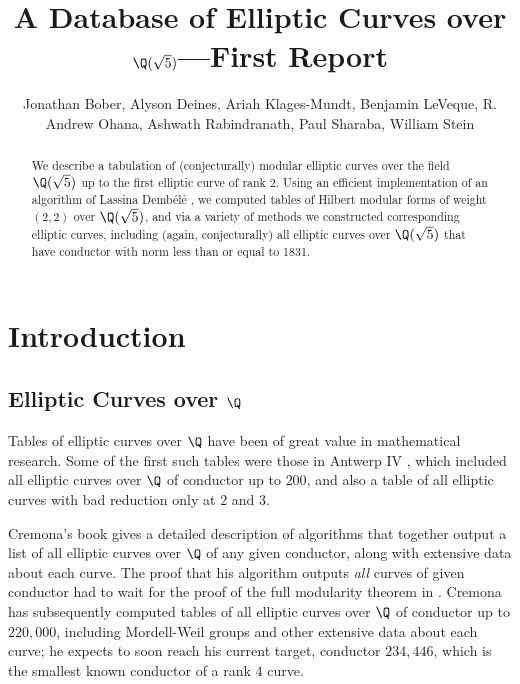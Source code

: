 \documentclass{amsart}
\title{A Database of Elliptic Curves over $\Q(\sqrt{5})$---First Report}
\author[Bober et al.]{Jonathan Bober, Alyson Deines, Ariah Klages-Mundt, Benjamin
  LeVeque, R. Andrew Ohana, Ashwath Rabindranath, Paul Sharaba, William
  Stein}
\newcommand{\dembele}{Demb\'el{\'e}\xspace}
\begin{document}
\begin{abstract} 
  We describe a tabulation of (conjecturally) modular elliptic curves
  over the field $\Q(\sqrt5)$ up to the first elliptic curve of rank $2$. Using
  an efficient implementation of an algorithm of Lassina \dembele
  \cite{dembele:hilbert5}, we computed tables of Hilbert modular
  forms of weight $(2,2)$ over $\Q(\sqrt 5)$, and via a variety of
  methods we constructed corresponding elliptic curves, including
  (again, conjecturally) all elliptic curves over $\Q(\sqrt5)$ that
  have conductor with norm less than or equal to 1831.
\end{abstract} 



\maketitle

\section{Introduction}\label{sec:intro}

\subsection{Elliptic Curves over $\Q$}
Tables of elliptic curves over $\Q$ have been of great value in
mathematical research.  Some of the first such tables were those in
Antwerp IV \cite{antwerpiv}, which included all elliptic curves over
$\Q$ of conductor up to $200$, and also a table of all elliptic curves
with bad reduction only at $2$ and $3$.  

Cremona's book \cite{cremona:algs} gives a detailed description of
algorithms that together output a list of all elliptic curves over
$\Q$ of any given conductor, along with extensive data about each
curve.  The proof that his algorithm outputs {\em all} curves of given
conductor had to wait for the proof of the full modularity theorem in
\cite{breuil-conrad-diamond-taylor}.  Cremona has subsequently
computed tables \cite{cremona:onlinetables} of all elliptic curves
over $\Q$ of conductor up to $220,\!000$, including Mordell-Weil
groups and other extensive data about each curve; he expects to soon
reach his current target, conductor $234,\!446$, which is the smallest
known conductor of a rank $4$ curve.
\end{document}
